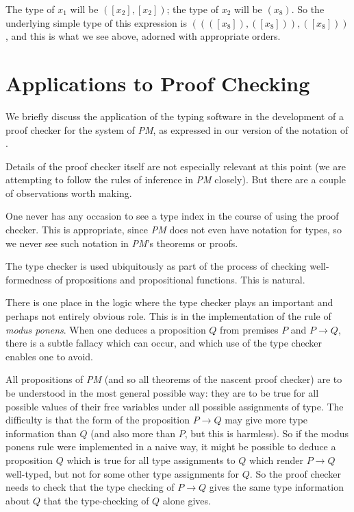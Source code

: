\documentclass{article}
\begin{document}
The type of $x_1$ will be $([x_2],[x_2])$; the type of $x_2$ will be
$(x_8)$.  So the underlying simple type of this expression is
$((([x_8]),([x_8])),([x_8]))$, and this is what we see above, adorned with
appropriate orders.

\section{Applications to Proof Checking}

We briefly discuss the application of the typing software in the
development of a proof checker for the system of {\em PM\/}, as
expressed in our version of the notation of \cite{types40}.

Details of the proof checker itself are not especially relevant at
this point (we are attempting to follow the rules of inference in {\em
PM\/} closely).  But there are a couple of observations worth making.

One never has any occasion to see a type index in the course of using
the proof checker.  This is appropriate, since {\em PM\/} does not
even have notation for types, so we never see such notation in {\em
PM\/}'s theorems or proofs.

The type checker is used ubiquitously as part of the process of
checking well-formedness of propositions and propositional functions.
This is natural.

There is one place in the logic where the type checker plays an
important and perhaps not entirely obvious role.  This is in the
implementation of the rule of {\em modus ponens\/}.  When one deduces a
proposition $Q$ from premises $P$ and $P \rightarrow Q$, there is a
subtle fallacy which can occur, and which use of the type checker
enables one to avoid.

All propositions of {\em PM\/} (and so all theorems of the nascent
proof checker) are to be understood in the most general possible way:
they are to be true for all possible values of their free variables
under all possible assignments of type.  The difficulty is that the
form of the proposition $P \rightarrow Q$ may give more type
information than $Q$ (and also more than $P$, but this is harmless).
So if the modus ponens rule were implemented in a naive way, it might
be possible to deduce a proposition $Q$ which is true for all type
assignments to $Q$ which render $P \rightarrow Q$ well-typed, but not
for some other type assignments for $Q$.  So the proof checker needs
to check that the type checking of $P \rightarrow Q$ gives the same
type information about $Q$ that the type-checking of $Q$ alone gives.
\end{document}
